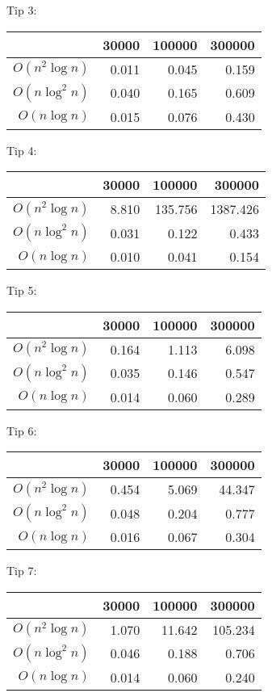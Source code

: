 Tip 3:

\begin{tabular}{r|r|r|r}
                & 30000 & 100000 & 300000 \\
\hline
$O(n^2 \log n)$ & 0.011& 0.045& 0.159  \\
\hline
$O(n \log^2 n)$ & 0.040& 0.165& 0.609  \\
\hline
$O(n \log n)$ & 0.015& 0.076& 0.430  \\
\end{tabular}

Tip 4:

\begin{tabular}{r|r|r|r}
                & 30000 & 100000 & 300000 \\
\hline
$O(n^2 \log n)$ & 8.810& 135.756& 1387.426  \\
\hline
$O(n \log^2 n)$ & 0.031& 0.122& 0.433  \\
\hline
$O(n \log n)$ & 0.010& 0.041& 0.154  \\
\end{tabular}

Tip 5:

\begin{tabular}{r|r|r|r}
                & 30000 & 100000 & 300000 \\
\hline
$O(n^2 \log n)$ & 0.164& 1.113& 6.098  \\
\hline
$O(n \log^2 n)$ & 0.035& 0.146& 0.547  \\
\hline
$O(n \log n)$ & 0.014& 0.060& 0.289  \\
\end{tabular}

Tip 6:

\begin{tabular}{r|r|r|r}
                & 30000 & 100000 & 300000 \\
\hline
$O(n^2 \log n)$ & 0.454& 5.069& 44.347  \\
\hline
$O(n \log^2 n)$ & 0.048& 0.204& 0.777  \\
\hline
$O(n \log n)$ & 0.016& 0.067& 0.304  \\
\end{tabular}

Tip 7:

\begin{tabular}{r|r|r|r}
                & 30000 & 100000 & 300000 \\
\hline
$O(n^2 \log n)$ & 1.070& 11.642& 105.234  \\
\hline
$O(n \log^2 n)$ & 0.046& 0.188& 0.706  \\
\hline
$O(n \log n)$ & 0.014& 0.060& 0.240  \\
\end{tabular}

